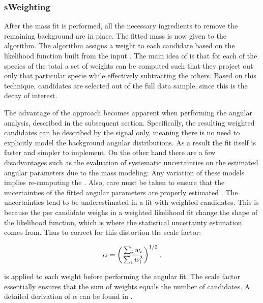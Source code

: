 \subsubsection{sWeighting}
After the mass fit is performed, all the necessary ingredients to remove the remaining background are in place.
The fitted mass \pdf is now given to the \sPlot algorithm. The algorithm assigns a weight to each candidate
based on the likelihood function built from the input \pdf. The main idea of \sPlot is that for each of the
species of the total \pdf a set of weights can be computed such that they project out only that particular
specie while effectively subtracting the others. Based on this technique, \BsJpsiKst candidates are selected
out of the full data sample, since this is the decay of interest.

The advantage of the \sWeights approach becomes apparent when performing the angular analysis, described in the subsequent section.
Specifically, the resulting weighted candidates can be described by the signal \pdf only, meaning there is no need to explicitly model
the background angular distributions. As a result the fit itself is faster and simpler to implement. On the other hand there are a few
disadvantages such as the evaluation of systematic uncertainties on the estimated angular parameters due to the mass \pdf modeling:
Any variation of these models implies re-computing the \sWeights. Also, care must be taken to ensure that the uncertainties
of the fitted angular parameters are properly estimated \cite{splot}. The uncertainties tend to be underestimated in a fit
with weighted candidates. This is because the per candidate weighs in a weighted likelihood fit change the shape of the
likelihood function, which is where the statistical uncertainty estimation comes from.
Thus to correct for this distortion the scale factor:

\begin{equation}
  \centering
  \alpha = \left(\frac{\sum_{i} w_i}{\sum_{i} w_i^2}\right)^{1/2},
  \label{sWeights_scale_factor}
\end{equation}

\noindent is applied to each weight before performing the angular fit. The scale factor essentially ensures that the sum of weights
equals the number of candidates. A detailed derivation of $\alpha$ can be found in \cite{jeroenThesis}.
